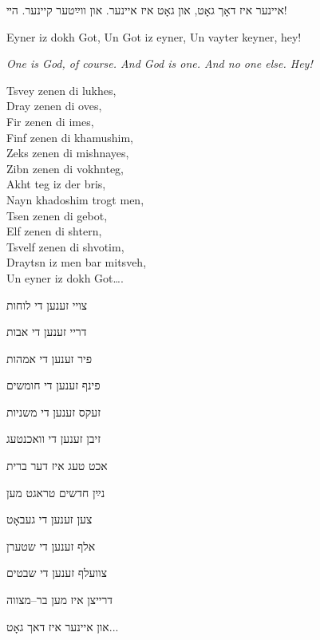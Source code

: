 \begin{center}
איינער איז דאָך גאָט,
און גאָט איז איינער. 
און ווײַטער קיינער. הײ!

\begin{english}
Eyner iz dokh Got,
Un Got iz eyner,
Un vayter keyner, hey!

{\itshape One is God, of course. 
And God is one. 
And no one else. Hey!}
\end{english}
\end{center}

\begin{minipage}{0.52\linewidth}
\begin{english}
Tsvey zenen di lukhes, \\
Dray zenen di oves, \\
Fir zenen di imes, \\
Finf zenen di khamushim, \\
Zeks zenen di mishnayes, \\
Zibn zenen di vokhnteg, \\
Akht teg iz der bris, \\
Nayn khadoshim trogt men, \\
Tsen zenen di gebot, \\
Elf zenen di shtern, \\
Tsvelf zenen di shvotim, \\
Draytsn iz men bar mitsveh, \\
Un eyner iz dokh Got….
\end{english}
\end{minipage} \hspace{0.02\linewidth}
\begin{minipage}{0.44\linewidth}
צויי זענען די לוחות

דריי זענען די אבות

פיר זענען די אמהות

פינף זענען די חומשים

זעקס זענען די משניות

זיבן זענען די וואכנטעג

אכט טעג איז דער ברית

נײַן חדשים טראגט מען

צען זענען די געבאָט

אלף זענען די שטערן

צוועלף זענען די שבטים

דרייצן איז מען בר–מצווה

און איינער איז דאך גאָט...
\end{minipage}

